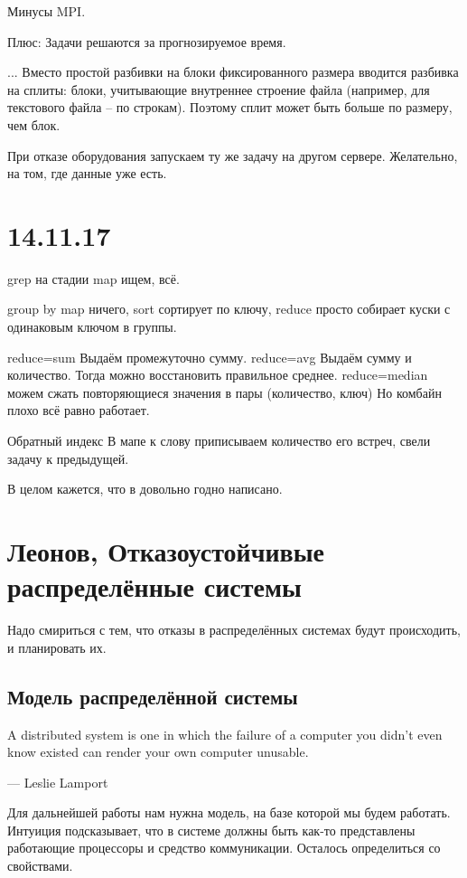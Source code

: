 Минусы MPI.

Плюс: Задачи решаются за прогнозируемое время.


...
Вместо простой разбивки на блоки фиксированного размера вводится разбивка на сплиты: блоки, учитывающие внутреннее строение файла (например, для текстового файла -- по строкам). Поэтому сплит может быть больше по размеру, чем блок.

При отказе оборудования запускаем ту же задачу на другом сервере. Желательно, на том, где данные уже есть. 

\section{14.11.17}
grep на стадии map ищем, всё.

group by
map ничего, sort сортирует по ключу, reduce просто собирает куски с одинаковым ключом в группы.

reduce=sum
Выдаём промежуточно сумму.
reduce=avg
Выдаём сумму и количество. Тогда можно восстановить правильное среднее.
reduce=median
можем сжать повторяющиеся значения в пары (количество, ключ)
Но комбайн плохо всё равно работает.


Обратный индекс
В мапе к слову приписываем количество его встреч, свели задачу к предыдущей.

В целом кажется, что в  довольно годно написано.

\section{Леонов, Отказоустойчивые распределённые системы}

Надо смириться с тем, что отказы в распределённых системах будут происходить, и планировать их.

\subsection{Модель распределённой системы}

A distributed system is one in which the failure of a computer you didn’t even know existed can render your own computer unusable.

--- Leslie Lamport

Для дальнейшей работы нам нужна модель, на базе которой мы будем работать. Интуиция подсказывает, что в системе должны быть как-то представлены работающие процессоры и средство коммуникации. Осталось определиться со свойствами.

